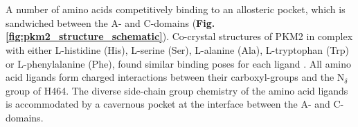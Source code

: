 %
%
\\\\
%
%
A number of amino acids competitively binding to an allosteric pocket, which is sandwiched between the A- and C-domains \cite{Yuan:2018aa} (\textbf{Fig. \ref{fig:pkm2_structure_schematic}}). Co-crystal structures of PKM2 in complex with either L-histidine (His), L-serine (Ser), L-alanine (Ala), L-tryptophan (Trp) or L-phenylalanine (Phe), found similar binding poses for each ligand \cite{Yuan:2018aa}. All amino acid ligands form charged interactions between their carboxyl-groups and the N$_{\delta}$ group of H464. The diverse side-chain group chemistry of the amino acid ligands is accommodated by a cavernous pocket at the interface between the A- and C-domains.
%
%
% 
% 

